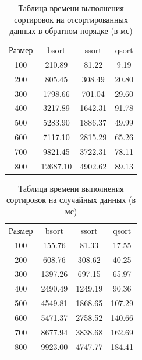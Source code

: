 \documentclass{report}
\begin{document}
\begin{table} [h!]
	\caption{Таблица времени выполнения сортировок на отсортированных данных в обратном порядке (в мс)}
	\begin{center}
	\begin{tabular}{|c c c c|}

		\hline

		Размер & bsort & ssort & qsort \\ [0.5ex]

100 & 210.89 & 81.22 & 9.19  \\ 
\hline
200 & 805.45 & 308.49 & 20.80  \\ 
\hline
300 & 1798.66 & 701.04 & 29.60  \\ 
\hline
400 & 3217.89 & 1642.31 & 91.78  \\ 
\hline
500 & 5283.90 & 1886.37 & 49.99  \\ 
\hline
600 & 7117.10 & 2815.29 & 65.26  \\ 
\hline
700 & 9821.45 & 3722.31 & 78.11  \\ 
\hline
800 & 12687.10 & 4902.62 & 89.13  \\ 
\hline

	\end{tabular}
	\end{center}
\end{table}

\begin{table} [h!]
	\caption{Таблица времени выполнения сортировок на случайных данных (в мс)}
	\begin{center}
	\begin{tabular}{|c c c c|}

		\hline

		Размер & bsort & ssort  & qsort \\ [0.5ex]
100 & 155.76 & 81.33 & 17.55  \\ 
\hline
200 & 608.76 & 308.62 & 40.25  \\ 
\hline
300 & 1397.26 & 697.15 & 65.97  \\ 
\hline
400 & 2490.49 & 1249.19 & 90.36  \\ 
\hline
500 & 4549.81 & 1868.65 & 107.29  \\ 
\hline
600 & 5471.37 & 2758.52 & 140.66  \\ 
\hline
700 & 8677.94 & 3838.68 & 162.69  \\ 
\hline
800 & 9923.00 & 4747.77 & 184.41  \\ 
\hline

	\end{tabular}
	\end{center}
\end{table}
\end{document}
